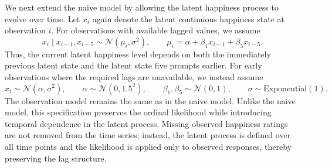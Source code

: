 \documentclass[12pt,letterpaper,fleqn]{article}
\begin{document}

We next extend the naive model by allowing the latent happiness process to evolve over time. Let \(x_i\) again denote the latent continuous happiness state at observation \(i\). For observations with available lagged values, we assume
\[
x_i \mid x_{i-1},x_{i-5} \sim \mathcal{N}(\mu_i,\sigma^2),
\qquad
\mu_i = \alpha + \beta_1 x_{i-1} + \beta_5 x_{i-5}.
\]
Thus, the current latent happiness level depends on both the immediately previous latent state and the latent state five prompts earlier. For early observations where the required lags are unavailable, we instead assume
\[
x_i \sim \mathcal{N}(\alpha,\sigma^2),
\qquad
\alpha \sim \mathcal{N}(0,1.5^2),
\qquad
\beta_1,\beta_5 \sim \mathcal{N}(0,1),
\qquad
\sigma \sim \mathrm{Exponential}(1).
\]
The observation model remains the same as in the naive model. Unlike the naive model, this specification preserves the ordinal likelihood while introducing temporal dependence in the latent process. Missing observed happiness ratings are not removed from the time series; instead, the latent process is defined over all time points and the likelihood is applied only to observed responses, thereby preserving the lag structure.


\end{document}
